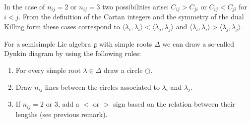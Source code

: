     \begin{remark}
        In the case of $n_{ij} = 2$ or $n_{ij} = 3$ two possibilities arise: $C_{ij}>C_{ji}$ or $C_{ij}<C_{ji}$ for $i<j$. From the definition of the Cartan integers and the symmetry of the dual Killing form these cases correspond to $\langle\lambda_i,\lambda_i\rangle<\langle\lambda_j,\lambda_j\rangle$ and $\langle\lambda_i,\lambda_i\rangle>\langle\lambda_j,\lambda_j\rangle$.
    \end{remark}

    \begin{construct}\label{lie:construct_dynkin}
        For a semisimple Lie algebra $\mathfrak{g}$ with simple roots $\Delta$ we can draw a so-called Dynkin diagram by using the following rules:
        \begin{enumerate}
            \item For every simple root $\lambda\in\Delta$ draw a circle $\bigcirc$.
            \item Draw $n_{ij}$ lines between the circles associated to $\lambda_i$ and $\lambda_j$.
            \item If $n_{ij}=2$ or 3, add a $<$ or $>$ sign based on the relation between their lengths (see previous remark).
        \end{enumerate}
    \end{construct}

